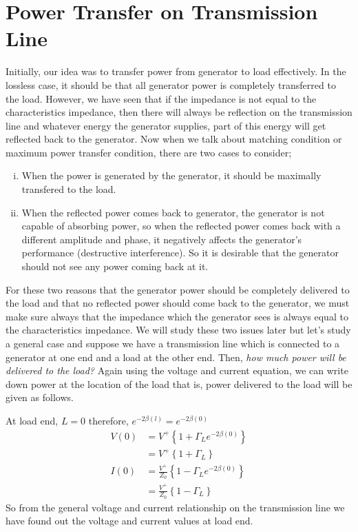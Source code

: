 \section{Power Transfer on Transmission Line}
Initially, our idea was to transfer power from generator to load effectively. In the lossless case, it should be that all generator power is completely transferred to the load. However, we have seen that if the impedance is not equal to the characteristics impedance, then there will always be reflection on the transmission line and whatever energy the generator supplies, part of this energy will get reflected back to the generator. Now when we talk about matching condition or maximum power transfer condition, there are two cases to consider;
\begin{enumerate}[(i)]
\item When the power is generated by the generator, it should be maximally transfered to the load.
\item When the reflected power comes back to generator, the generator is not capable of absorbing power, so when the reflected power comes back with a different amplitude and phase, it negatively affects the generator's performance (destructive interference). So it is desirable that the generator should not see any power coming back at it.
\end{enumerate}
For these two reasons that the generator power should be completely delivered to the load and that no reflected power should come back to the generator, we must make sure always that the impedance which the generator sees is always equal to the characteristics impedance. We will study these two issues later but let's study a general case and suppose we have a transmission line which is connected to a generator at  one end and a load at the other end. Then, \emph{how much power will be delivered to the load?} Again using the voltage and current equation, we can write down power at the location of the load that is, power delivered to the load will be given as follows.

At load end, $L=0$ therefore, $e^{-2\beta (l)} = e^{-2\beta (0)}$
\begin{align*}
V(0) &= V^{+} \left\lbrace {1 + \Gamma_L e^{-2\beta(0)}}\right\rbrace\\ 
&= V^{+}\left\lbrace 1 +\Gamma_L \right\rbrace\\
I(0) &= \frac{V^{+}}{Z_0} \left\lbrace{1 - \Gamma_L e^{-2\beta(0)}}\right\rbrace\\ 
&= \frac{V^{+}}{Z_0}\left\lbrace1 -\Gamma_L \right\rbrace
\end{align*}
So from the general voltage and current relationship on the transmission line we have found  out the voltage and current values at load end.

